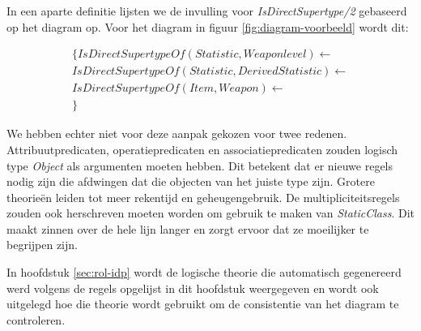 In een aparte definitie lijsten we de invulling voor \textit{IsDirectSupertype/2} gebaseerd op het diagram op. Voor het diagram in figuur \ref{fig:diagram-voorbeeld} wordt dit:

\begin{align*}
\{
IsDirectSupertypeOf(Statistic,Weaponlevel) \leftarrow \\
IsDirectSupertypeOf(Statistic,DerivedStatistic) \leftarrow \\
IsDirectSupertypeOf(Item,Weapon) \leftarrow \\
\}
\end{align*}

We hebben echter niet voor deze aanpak gekozen voor twee redenen.
Attribuutpredicaten, operatiepredicaten en associatiepredicaten zouden logisch type \textit{Object} als argumenten moeten hebben. Dit betekent dat er nieuwe regels nodig zijn die afdwingen dat die objecten van het juiste type zijn. Grotere theorie\"en leiden tot meer rekentijd en geheugengebruik.
De multipliciteitsregels zouden ook herschreven moeten worden om gebruik te maken van \textit{StaticClass}. Dit maakt zinnen over de hele lijn langer en zorgt ervoor dat ze moeilijker te begrijpen zijn.

\parbreak

In hoofdstuk \ref{sec:rol-idp} wordt de logische theorie die automatisch gegenereerd werd volgens de regels opgelijst in dit hoofdstuk weergegeven en wordt ook uitgelegd hoe die theorie wordt gebruikt om de consistentie van het diagram te controleren.